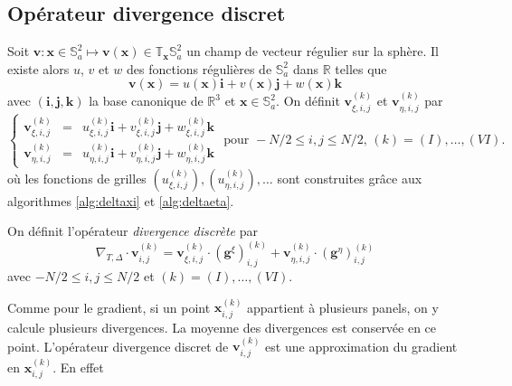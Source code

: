 \subsection{Opérateur divergence discret}

Soit $\mathbf{v} : \mathbf{x} \in \mathbb{S}_a^2 \mapsto \mathbf{v}(\mathbf{x}) \in \mathbb{T}_{\mathbf{x}} \mathbb{S}_a^2$ un champ de vecteur régulier sur la sphère. Il existe alors $u$, $v$ et $w$ des fonctions régulières de $\mathbb{S}_a^2$ dans $\mathbb{R}$ telles que
\begin{equation}
\mathbf{v}(\mathbf{x}) = u(\mathbf{x}) \mathbf{i} + v (\mathbf{x}) \mathbf{j} + w(\mathbf{x}) \mathbf{k}
\end{equation}
avec $(\mathbf{i}, \mathbf{j}, \mathbf{k})$ la base canonique de $\mathbb{R}^3$ et $\mathbf{x} \in \mathbb{S}_a^2$. On définit $\mathbf{v}_{\xi,i,j}^{(k)}$ et $\mathbf{v}_{\eta,i,j}^{(k)}$ par
\begin{equation}
\left\lbrace
\begin{array}{rcl}
\mathbf{v}_{\xi,i,j}^{(k)} & = & u_{\xi,i,j}^{(k)} \mathbf{i} + v_{\xi,i,j}^{(k)} \mathbf{j} + w_{\xi,i,j}^{(k)} \mathbf{k} \\
\mathbf{v}_{\eta,i,j}^{(k)} & = & u_{\eta,i,j}^{(k)} \mathbf{i} + v_{\eta,i,j}^{(k)} \mathbf{j} + w_{\eta,i,j}^{(k)} \mathbf{k}
\end{array}
\right.
\text{ pour } -N/2 \leq  i,j \leq N/2 \text{, } (k) = (I), \ldots, (VI). 
\label{eq:der_partiel_vect}
\end{equation}
où les fonctions de grilles $(u_{\xi,i,j}^{(k)}), (u_{\eta,i,j}^{(k)}),  \ldots$ sont construites grâce aux algorithmes \ref{alg:deltaxi} et \ref{alg:deltaeta}.

\begin{definition}
On définit l'opérateur \textit{divergence discrète} par 
\begin{equation}
\nabla_{T,\Delta} \cdot \mathbf{v}_{i,j}^{(k)} = \mathbf{v}_{\xi,i,j}^{(k)} \cdot ( \mathbf{g}^{\xi} )_{i,j}^{(k)} + \mathbf{v}_{\eta,i,j}^{(k)} \cdot ( \mathbf{g}^{\eta} )_{i,j}^{(k)}
\end{equation}
avec $-N/2 \leq i,j \leq N/2$ et $(k) = (I), \ldots , (VI)$.
\label{def:divergence_disc}
\end{definition}
Comme pour le gradient, si un point $\mathbf{x}_{i,j}^{(k)}$ appartient à plusieurs panels, on y calcule plusieurs divergences. La moyenne des divergences est conservée en ce point.
L'opérateur divergence discret de $\mathbf{v}_{i,j}^{(k)}$ est une approximation du gradient en $\mathbf{x}_{i,j}^{(k)}$. En effet

